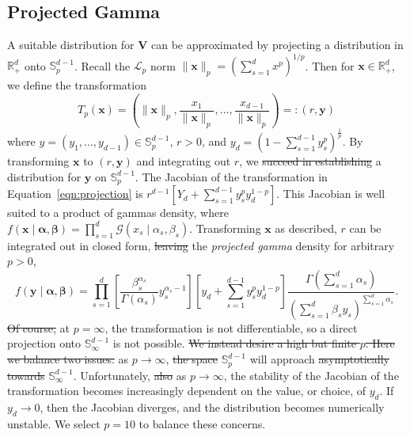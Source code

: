 \subsection{Projected Gamma\label{ref:pg}}
A suitable distribution for $\bm{V}$ can be approximated by projecting a 
    distribution in $\mathbb{R}_+^d$ onto $\mathbb{S}_{p}^{d-1}$.  
    Recall the $\mathcal{L}_p$ norm 
    $\lVert \bm{x}\rVert_p = \left(\sum_{s = 1}^dx^p\right)^{1/p}$.  Then
    for $\bm{x}\in\mathbb{R}_+^d$, we define the transformation
    \begin{equation}
        \label{eqn:projection}
        T_p(\bm{x}) = \left(\lVert \bm{x}\rVert_p, 
            \frac{x_1}{\lVert \bm{x}\rVert_p},\ldots, 
                \frac{x_{d-1}}{\lVert \bm{x}\rVert_p}\right)
                =: (r,\bm{y})
    \end{equation}
    where $y = (y_1,\ldots,y_{d-1}) \in \mathbb{S}_{p}^{d-1}$, $r > 0$, and 
    $y_d = (1 - \sum_{s = 1}^{d-1}y_{s}^p)^{\frac{1}{p}}$.
    By transforming $\bm{x}$ to $(r,\bm{y})$ and integrating out $r$, we
    \st{succeed in establishing}  a distribution for $\bm{y}$ on 
    $\mathbb{S}_{p}^{d-1}$.
    The Jacobian of the transformation in Equation~\eqref{eqn:projection} is
    $r^{d-1}[Y_d + \sum_{s = 1}^{d-1}y_{s}^py_d^{1-p}]$.
    This Jacobian is well suited to a product of gammas density, where 
    $f(\bm{x}\mid\bm{\alpha},\bm{\beta}) = 
        \prod_{s = 1}^d\mathcal{G}(x_{s}\mid\alpha_{s},\beta_{s})$.
    Transforming $\bm{x}$ as described, $r$ can be integrated out in closed
    form, \st{leaving}  the \emph{projected gamma} density for arbitrary $p > 0$,
    \[
        f(\bm{y}\mid\bm{\alpha},\bm{\beta}) = \prod_{s = 1}^d\left[
            \frac{\beta_{s}^{\alpha_{s}}}{\Gamma(\alpha_{s})}
            y_{s}^{\alpha_{s} - 1}\right]
            \left[y_d + \sum_{s = 1}^{d-1}y_{s}^py_d^{1-p}\right]
            \frac{\Gamma(\sum_{s = 1}^d \alpha_{s})}{\left(
                \sum_{s = 1}^d\beta_{s}y_{s}
                \right)^{\sum_{s = 1}^d \alpha_{s}}
            }.
    \]
    \st{Of course,}  at $p=\infty$, the transformation is not differentiable, so a 
    direct projection onto $\mathbb{S}_{\infty}^{d-1}$ is not possible. \st{We
    instead desire a high but finite $p$.
    Here we balance two issues:}  as $p\to\infty$, \st{the space} $\mathbb{S}_{p}^{d-1}$ 
    will approach \st{asymptotically towards} $\mathbb{S}_{\infty}^{d-1}$.
    Unfortunately, \st{also} as $p\to\infty$, the stability of the Jacobian of the
    transformation becomes increasingly dependent on the value, or choice, of 
    $y_d$.  If $y_d\to 0$, then the Jacobian diverges, and the distribution 
    becomes numerically unstable. We select $p = 10$ to balance these concerns.

